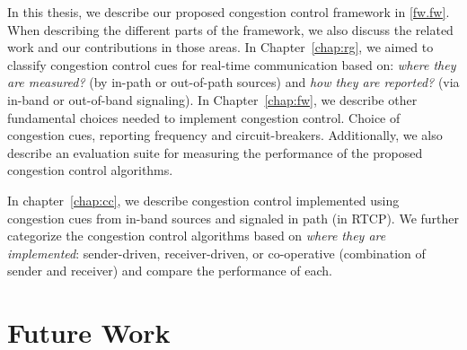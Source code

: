 
In this thesis, we describe our proposed congestion control framework in
\ref{fw.fw}. When describing the different parts of the framework, we also
discuss the related work and our contributions in those areas. In
Chapter~\ref{chap:rg}, we aimed to classify congestion control cues for
real-time communication based on: \emph{where they are measured?} (by in-path
or out-of-path sources) and \emph{how they are reported?} (via in-band or
out-of-band signaling). In Chapter~\ref{chap:fw}, we describe other
fundamental choices needed to implement congestion control. Choice of
congestion cues, reporting frequency and circuit-breakers. Additionally, we
also describe an evaluation suite for measuring the performance of the
proposed congestion control algorithms.

In chapter~\ref{chap:cc}, we describe congestion control implemented using
congestion cues from in-band sources and signaled in path (in RTCP). We
further categorize the congestion control algorithms based on \emph{where they
are implemented}: sender-driven, receiver-driven, or co-operative (combination
of sender and receiver) and compare the performance of each.

\section{Future Work}
